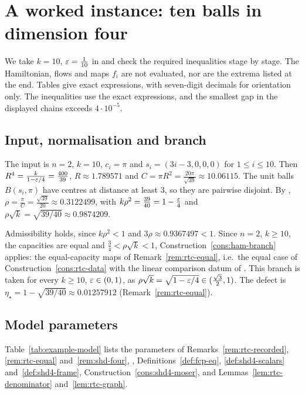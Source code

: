 \section{A worked instance: ten balls in dimension four}\label{sec:example}

We take $k=10$, $\varepsilon=\frac1{10}$ in  and check the required inequalities stage by stage. The Hamiltonian, flows and maps $f_i$ are not evaluated, nor are the extrema listed at the end. Tables give exact expressions, with seven-digit decimals for orientation only. The inequalities use the exact expressions, and the smallest gap in the displayed chains exceeds $4\cdot10^{-5}$.

\subsection{Input, normalisation and branch}

The input is $n=2$, $k=10$, $c_i=\pi$ and $s_i=(3i-3,0,0,0)$ for $1\le i\le10$. Then $R^4=\frac k{1-\varepsilon/4}=\frac{400}{39}$, $R\approx1.789571$ and $C=\pi R^2=\frac{20\pi}{\sqrt{39}}\approx10.06115$. The unit balls $B(s_i,\pi)$ have centres at distance at least $3$, so they are pairwise disjoint. By , $\rho=\frac{\pi}{C}=\frac{\sqrt{39}}{20}\approx0.3122499$, with $k\rho^2=\frac{39}{40}=1-\frac{\varepsilon}4$ and $\rho\sqrt k=\sqrt{39/40}\approx0.9874209$.

Admissibility holds, since $k\rho^2<1$ and $3\rho\approx0.9367497<1$. Since $n=2$, $k\ge10$, the capacities are equal and $\frac34<\rho\sqrt k<1$, Construction~\ref{cons:ham-branch} applies: the equal-capacity maps of Remark~\ref{rem:rtc-equal}, i.e.\ the equal case of Construction~\ref{cons:rtc-data} with the linear comparison datum of . This branch is taken for every $k\ge10$, $\varepsilon\in(0,1)$, as $\rho\sqrt k=\sqrt{1-\varepsilon/4}\in(\frac{\sqrt3}2,1)$. The defect is $\eta_\star=1-\sqrt{39/40}\approx0.01257912$ (Remark~\ref{rem:rtc-equal}).

\subsection{Model parameters}

Table~\ref{tab:example-model} lists the parameters of Remarks~\ref{rem:rtc-recorded}, \ref{rem:rtc-equal} and~\ref{rem:shd-four}, , Definitions~\ref{def:fcp-eq}, \ref{def:shd4-scalars} and~\ref{def:shd4-frame}, Construction~\ref{cons:shd4-moser}, and Lemmas~\ref{lem:rtc-denominator} and~\ref{lem:rtc-graph}.

